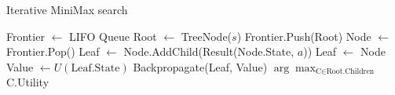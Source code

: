 \begin{algorithm}[H]
    \caption{Iterative MiniMax search}
    \label{alg:iterative_minimax}
    \begin{algorithmic}[1]
    
        \State Frontier $\leftarrow$ LIFO Queue
        \State Root $\leftarrow$ TreeNode($s$)
        \State Frontier.Push(Root)
            \State Node $\leftarrow$ Frontier.Pop() 
             
                \State Leaf $\leftarrow$ Node.AddChild(Result(Node.State, $a$))
            \EndFor
                Leaf $\leftarrow$ Node
            \EndIf
                \State Value $\leftarrow U(\text{Leaf.State})$ 
                \State Backpropagate(Leaf, Value) 
            \EndIf
        \EndWhile
        \State \Return $\arg\max_{\text{C} \in \text{Root.Children}}$ C.Utility
    \EndProcedure
    \end{algorithmic}
\end{algorithm}